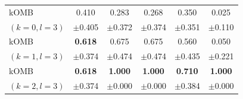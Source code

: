 \begin{tabular}{lccccc}
kOMB 
& 0.410 & 0.283 & 0.268 & 0.350 & 0.025 \\
{\scriptsize $(k=0,l=3)$}
& {\scriptsize $\pm$0.405} & {\scriptsize $\pm$0.372} & {\scriptsize $\pm$0.374} & {\scriptsize $\pm$0.351} & {\scriptsize $\pm$0.110} \\

kOMB
& \textbf{0.618} & 0.675 & 0.675 & 0.560 & 0.050 \\
{\scriptsize $(k=1,l=3)$}
& {\scriptsize $\pm$0.374} & {\scriptsize $\pm$0.474} & {\scriptsize $\pm$0.474} & {\scriptsize $\pm$0.435} & {\scriptsize $\pm$0.221} \\

kOMB
& \textbf{0.618} & \textbf{1.000} & \textbf{1.000} & \textbf{0.710} & \textbf{1.000} \\
{\scriptsize $(k=2,l=3)$}
& {\scriptsize $\pm$0.374} & {\scriptsize $\pm$0.000} & {\scriptsize $\pm$0.000} & {\scriptsize $\pm$0.384} & {\scriptsize $\pm$0.000} \\

\bottomrule
\end{tabular}
